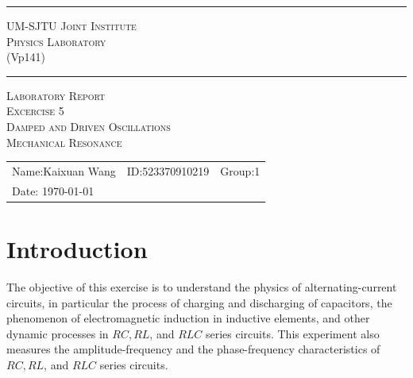 \documentclass[12pt, a4paper, oneside]{article}
\begin{document}
\begin{center}
	\rule{\textwidth}{1pt}\par
	\vspace{5mm}
	{\large\scshape UM-SJTU Joint Institute}\\[\baselineskip]
	{\large\scshape Physics Laboratory}\\
	(Vp141)
	\rule{\textwidth}{1pt}\par
	\vspace{4cm}
	{\large\scshape Laboratory Report}\\[\baselineskip]
	{\large\scshape Excercise 5}\\[\baselineskip]
	{\large\scshape Damped and Driven Oscillations\\Mechanical Resonance}\\[\baselineskip]
\end{center}
\vspace{7cm}

\begin{tabular}{lll}
	Name:Kaixuan Wang & ID:523370910219 & Group:1 \\
	Date: {\today}    &                 &         \\
\end{tabular}


\rightline{\footnotesize[rev4.1]}
\pagebreak

\section{Introduction}
\indent

The objective of this exercise is to understand the physics of alternating-current circuits, in particular the process of charging
and discharging of capacitors, the phenomenon of electromagnetic induction in inductive elements, and other dynamic processes in $RC,
RL$, and $RLC$ series circuits. This experiment also measures the amplitude-frequency and the phase-frequency characteristics of $RC,
RL$, and $RLC$ series circuits.
\end{document}

